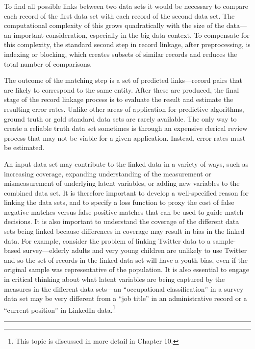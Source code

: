 \documentclass[]{krantz}
\begin{document}
To find all possible links between two data sets it would be necessary
to compare each record of the first data set with each record of the
second data set. The computational complexity of this grows
quadratically with the size of the data---an important consideration,
especially in the big data context. To compensate for this complexity,
the standard second step in record linkage, after preprocessing, is
indexing or blocking, which creates subsets of similar records and
reduces the total number of comparisons.

The outcome of the matching step is a set of predicted links---record
pairs that are likely to correspond to the same entity. After these are
produced, the final stage of the record linkage process is to evaluate
the result and estimate the resulting error rates. Unlike other areas of
application for predictive algorithms, ground truth or gold standard
data sets are rarely available. The only way to create a reliable truth
data set sometimes is through an expensive clerical review process that
may not be viable for a given application. Instead, error rates must be
estimated.

An input data set may contribute to the linked data in a variety of
ways, such as increasing coverage, expanding understanding of the
measurement or mismeasurement of underlying latent variables, or adding
new variables to the combined data set. It is therefore important to
develop a well-specified reason for linking the data sets, and to
specify a loss function to proxy the cost of false negative matches
versus false positive matches that can be used to guide match decisions.
It is also important to understand the coverage of the different data
sets being linked because differences in coverage may result in bias in
the linked data. For example, consider the problem of linking Twitter
data to a sample-based survey---elderly adults and very young children
are unlikely to use Twitter and so the set of records in the linked data
set will have a youth bias, even if the original sample was
representative of the population. It is also essential to engage in
critical thinking about what latent variables are being captured by the
measures in the different data sets---an ``occupational classification''
in a survey data set may be very different from a ``job title'' in an
administrative record or a ``current position'' in LinkedIn
data.\footnote{This topic is discussed in more detail in Chapter 10.}

\begin{center}\rule{0.5\linewidth}{\linethickness}\end{center}
\end{document}
